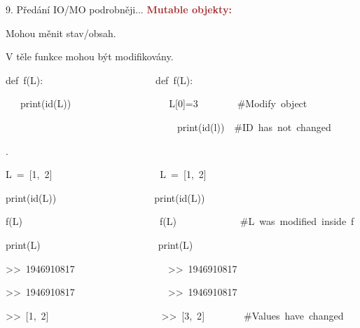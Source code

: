 \documentclass[czech]{beamer}
\newenvironment{lyxcode}
  {\par\begin{list}{}{
    \setlength{\rightmargin}{\leftmargin}
    \setlength{\listparindent}{0pt}%
    \raggedright
    \setlength{\itemsep}{0pt}
    \setlength{\parsep}{0pt}
    \normalfont\ttfamily}%
   \def\{{\char`\{}
   \def\}{\char`\}}
   \def\textasciitilde{\char`\~}
   \item[]}
  {\end{list}}
\begin{document}
\begin{frame}{9. Předání IO/MO podrobněji...}
{\tiny\textbf{\textcolor{brown}{Mutable objekty:}}}{\tiny\par}

{\tiny Mohou měnit stav/obsah.}{\tiny\par}

{\tiny V těle funkce mohou být modifikovány.}{\tiny\par}
\begin{lyxcode}
{\tiny def~f(L):~~~~~~~~~~~~~~~~~~~~~~~def~f(L):~~}{\tiny\par}

{\tiny ~~~print(id(L))~~~~~~~~~~~~~~~~~~~~L{[}0{]}=3~~~~~~~~\#Modify~object}{\tiny\par}

{\tiny ~~~~~~~~~~~~~~~~~~~~~~~~~~~~~~~~~~~print(id(l))~~\#ID~has~not~changed}{\tiny\par}

{\tiny .}{\tiny\par}

{\tiny L~=~{[}1,~2{]}~~~~~~~~~~~~~~~~~~~~~~L~=~{[}1,~2{]}}{\tiny\par}

{\tiny print(id(L))~~~~~~~~~~~~~~~~~~~~print(id(L))~}{\tiny\par}

{\tiny f(L)~~~~~~~~~~~~~~~~~~~~~~~~~~~~f(L)~~~~~~~~~~~~~\#L~was~modified~inside~f}{\tiny\par}

{\tiny print(L)~~~~~~~~~~~~~~~~~~~~~~~~print(L)}{\tiny\par}

{\tiny >\textcompwordmark >~1946910817~~~~~~~~~~~~~~~~~~~>\textcompwordmark >~1946910817}{\tiny\par}

{\tiny >\textcompwordmark >~1946910817~~~~~~~~~~~~~~~~~~~>\textcompwordmark >~1946910817}{\tiny\par}

{\tiny >\textcompwordmark >~{[}1,~2{]}~~~~~~~~~~~~~~~~~~~~~~~>\textcompwordmark >~{[}3,~2{]}~~~~~~~~\#Values~have~changed}{\tiny\par}
\end{lyxcode}
\end{frame}
\end{document}
